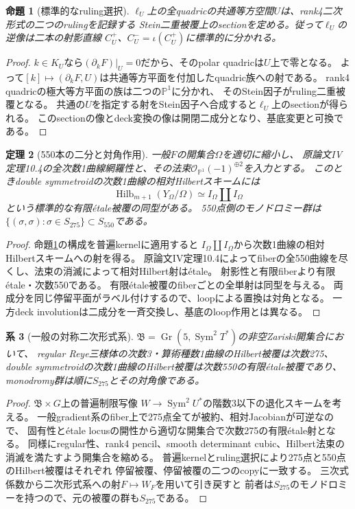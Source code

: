 \documentclass[11pt,a4paper]{ltjsarticle}
\newtheorem{theorem}{定理}[section]
\newtheorem{proposition}[theorem]{命題}
\newtheorem{corollary}[theorem]{系}
\newcommand{\PP}{\mathbb P}
\newcommand{\OO}{\mathcal O}
\newcommand{\Gr}{\operatorname{Gr}}
\newcommand{\Sym}{\operatorname{Sym}}
\newcommand{\Hilb}{\operatorname{Hilb}}
\begin{document}
\begin{proposition}[標準的なruling選択]\label{prop:ruling}
$\ell_U$上の全quadricの共通等方空間$U$は、rank4二次形式の二つのrulingを記録する
Stein二重被覆上のsectionを定める。従って$\ell_U$の逆像は二本の射影直線
$C_U^+$、$C_U^-=\iota(C_U^+)$に標準的に分かれる。
\end{proposition}
\begin{proof}
$k\in K_U$なら$(\partial_kF)|_U=0$だから、そのpolar quadricは$U$上で零となる。
よって$[k]\mapsto(\partial_kF,U)$は共通等方平面を付加したquadric族への射である。
rank4 quadricの極大等方平面の族は二つの$\PP^1$に分かれ、
そのStein因子がruling二重被覆となる\cite{HT}。
共通の$U$を指定する射をStein因子へ合成すると$\ell_U$上のsectionが得られる。
このsectionの像とdeck変換の像は開閉二成分となり、基底変更と可換である。
\end{proof}

\begin{theorem}[550本の二分と対角作用]\label{thm:550}
一般$F$の開集合$\Omega$を適切に縮小し、
原論文IV定理10.4の全次数1曲線網羅性と、その法束$\OO_{\PP^1}(-1)^{\oplus2}$を入力とする。
このときdouble symmetroidの次数1曲線の相対Hilbertスキームには
\[
 \Hilb_{m+1}(Y_\Omega/\Omega)\simeq I_\Omega\amalg I_\Omega
\]
という標準的な有限étale被覆の同型がある。
550点側のモノドロミー群は$\{(\sigma,\sigma):\sigma\in S_{275}\}\subset S_{550}$である。
\end{theorem}
\begin{proof}
命題\ref{prop:ruling}の構成を普遍kernelに適用すると
$I_\Omega\amalg I_\Omega$から次数1曲線の相対Hilbertスキームへの射を得る。
原論文IV定理10.4によってfiberの全550曲線を尽くし、法束の消滅によって相対Hilbert射はétale。
射影性と有限fiberより有限étale・次数550である。
有限étale被覆のfiberごとの全単射は同型を与える。
両成分を同じ停留平面がラベル付けするので、loopによる置換は対角となる。
一方deck involutionは二成分を一斉交換し、基底のloop作用とは異なる。
\end{proof}

\begin{corollary}[一般の対称二次形式系]\label{cor:generalW}
$\mathfrak B=\Gr(5,\Sym^2T^*)$の非空Zariski開集合において、
regular Reye三様体の次数3・算術種数1曲線のHilbert被覆は次数275、
double symmetroidの次数1曲線のHilbert被覆は次数550の有限étale被覆であり、
monodromy群は順に$S_{275}$とその対角像である。
\end{corollary}
\begin{proof}
$\mathfrak B\times G$上の普遍制限写像
$W\to\Sym^2U^*$の階数3以下の退化スキームを考える。
一般gradient系のfiber上で275点全てが被約、相対Jacobianが可逆なので、
固有性とétale locusの開性から適切な開集合で次数275の有限étale射となる。
同様にregular性、rank4 pencil、smooth determinant cubic、Hilbert法束の消滅を満たすよう開集合を縮める。
普遍kernelとruling選択により275点と550点のHilbert被覆はそれぞれ
停留被覆、停留被覆の二つのcopyに一致する。
三次式係数から二次形式系への射$F\mapsto W_F$を用いて引き戻すと
前者は$S_{275}$のモノドロミーを持つので、元の被覆の群も$S_{275}$である。
\end{proof}
\end{document}
